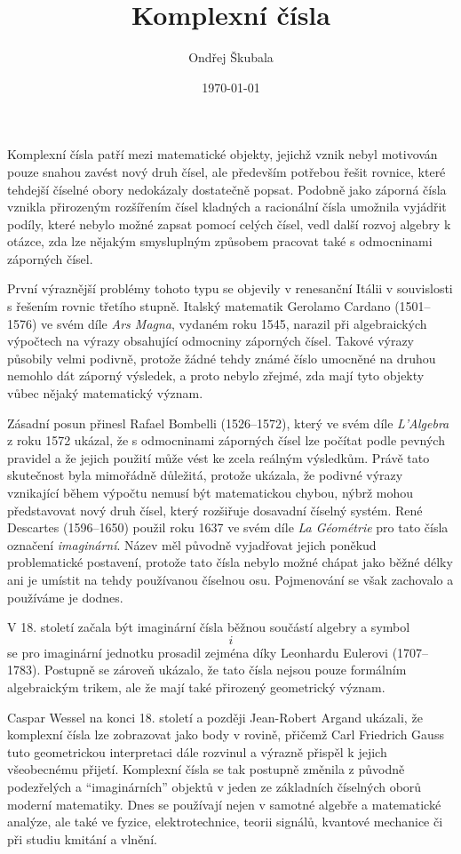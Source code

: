 \documentclass[12pt,a4paper]{article}
\title{Komplexní čísla}
\author{Ondřej Škubala}
\date{\today}
\begin{document}
\maketitle
\newpage





\begin{historicalbox}
Komplexní čísla patří mezi matematické objekty, jejichž vznik nebyl motivován pouze
snahou zavést nový druh čísel, ale především potřebou řešit rovnice, které tehdejší
číselné obory nedokázaly dostatečně popsat. Podobně jako záporná čísla vznikla
přirozeným rozšířením čísel kladných a racionální čísla umožnila vyjádřit podíly,
které nebylo možné zapsat pomocí celých čísel, vedl další rozvoj algebry k otázce,
zda lze nějakým smysluplným způsobem pracovat také s odmocninami záporných čísel.

První výraznější problémy tohoto typu se objevily v renesanční Itálii v souvislosti
s řešením rovnic třetího stupně. Italský matematik Gerolamo Cardano
(1501--1576) ve svém díle \textit{Ars Magna}, vydaném roku 1545, narazil při
algebraických výpočtech na výrazy obsahující odmocniny záporných čísel. Takové
výrazy působily velmi podivně, protože žádné tehdy známé číslo umocněné na druhou
nemohlo dát záporný výsledek, a proto nebylo zřejmé, zda mají tyto objekty vůbec
nějaký matematický význam.

Zásadní posun přinesl Rafael Bombelli (1526--1572), který ve svém díle
\textit{L'Algebra} z roku 1572 ukázal, že s odmocninami záporných čísel lze
počítat podle pevných pravidel a že jejich použití může vést ke zcela reálným
výsledkům. Právě tato skutečnost byla mimořádně důležitá, protože ukázala, že
podivné výrazy vznikající během výpočtu nemusí být matematickou chybou, nýbrž
mohou představovat nový druh čísel, který rozšiřuje dosavadní číselný systém.
René Descartes (1596--1650) použil roku 1637 ve svém díle
\textit{La Géométrie} pro tato čísla označení \emph{imaginární}. Název měl
původně vyjadřovat jejich poněkud problematické postavení, protože tato čísla nebylo
možné chápat jako běžné délky ani je umístit na tehdy používanou číselnou osu.
Pojmenování se však zachovalo a používáme je dodnes.

V 18. století začala být imaginární čísla běžnou součástí algebry a symbol
\[
    i
\]
se pro imaginární jednotku prosadil zejména díky Leonhardu Eulerovi (1707--1783).
Postupně se zároveň ukázalo, že tato čísla nejsou pouze formálním algebraickým
trikem, ale že mají také přirozený geometrický význam.

Caspar Wessel na konci 18. století a později Jean-Robert Argand ukázali, že komplexní
čísla lze zobrazovat jako body v rovině, přičemž Carl Friedrich Gauss tuto geometrickou
interpretaci dále rozvinul a výrazně přispěl k jejich všeobecnému přijetí.
Komplexní čísla se tak postupně změnila z původně podezřelých a
``imaginárních'' objektů v jeden ze základních číselných oborů moderní matematiky.
Dnes se používají nejen v samotné algebře a matematické analýze, ale také ve fyzice,
elektrotechnice, teorii signálů, kvantové mechanice či při studiu kmitání a vlnění.
\end{historicalbox}
\end{document}
